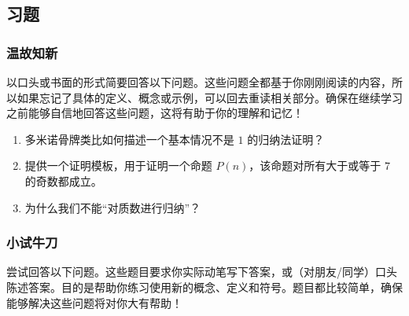 \subsection{习题}\label{sec:section5.3.4}

\subsubsection*{温故知新}

以口头或书面的形式简要回答以下问题。这些问题全都基于你刚刚阅读的内容，所以如果忘记了具体的定义、概念或示例，可以回去重读相关部分。确保在继续学习之前能够自信地回答这些问题，这将有助于你的理解和记忆！

\begin{enumerate}[label=(\arabic*)]
    \item 多米诺骨牌类比如何描述一个基本情况不是 $1$ 的归纳法证明？
    \item 提供一个证明模板，用于证明一个命题 $P(n)$，该命题对所有大于或等于 $7$ 的奇数都成立。
    \item 为什么我们不能``对质数进行归纳''？
\end{enumerate}

\subsubsection*{小试牛刀}

尝试回答以下问题。这些题目要求你实际动笔写下答案，或（对朋友/同学）口头陈述答案。目的是帮助你练习使用新的概念、定义和符号。题目都比较简单，确保能够解决这些问题将对你大有帮助！

